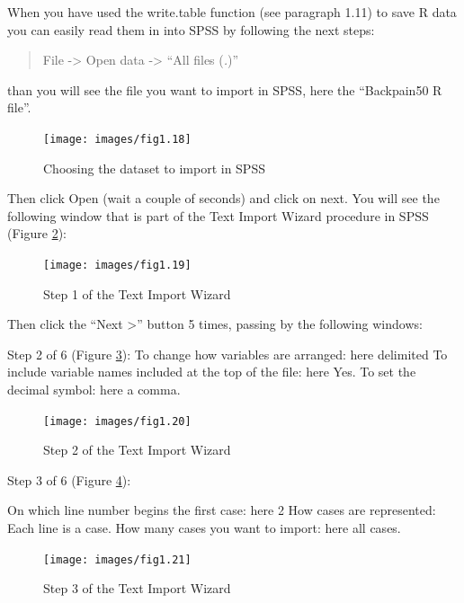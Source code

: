 \documentclass[
]{book}
\begin{document}
When you have used the write.table function (see paragraph 1.11) to save R data you can easily read them in into SPSS by following the next steps:

\begin{quote}
File -\textgreater{} Open data -\textgreater{} ``All files (\emph{.})''
\end{quote}

than you will see the file you want to import in SPSS, here the ``Backpain50 R file''.

\begin{figure}

{\centering \texttt{[image: images/fig1.18]} 

}

\caption{Choosing the dataset to import in SPSS}\label{fig:fig18}
\end{figure}

Then click Open (wait a couple of seconds) and click on next. You will see the following window that is part of the Text Import Wizard procedure in SPSS (Figure \ref{fig:fig19}):

\begin{figure}

{\centering \texttt{[image: images/fig1.19]} 

}

\caption{Step 1 of the Text Import Wizard}\label{fig:fig19}
\end{figure}

Then click the ``Next \textgreater{}'' button 5 times, passing by the following windows:

Step 2 of 6 (Figure \ref{fig:fig20}):
To change how variables are arranged: here delimited
To include variable names included at the top of the file: here Yes.
To set the decimal symbol: here a comma.

\begin{figure}

{\centering \texttt{[image: images/fig1.20]} 

}

\caption{Step 2 of the Text Import Wizard}\label{fig:fig20}
\end{figure}

Step 3 of 6 (Figure \ref{fig:fig21}):

On which line number begins the first case: here 2
How cases are represented: Each line is a case.
How many cases you want to import: here all cases.

\begin{figure}

{\centering \texttt{[image: images/fig1.21]} 

}

\caption{Step 3 of the Text Import Wizard}\label{fig:fig21}
\end{figure}
\end{document}
